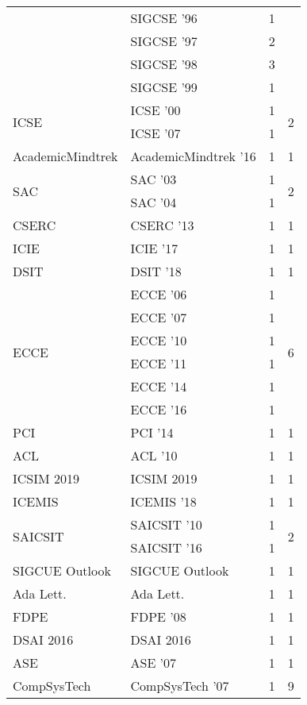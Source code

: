 \begin{table*}[t]
\begin{tabular}{llrr}
& SIGCSE '96 & 1 &\\
& SIGCSE '97 & 2 &\\
& SIGCSE '98 & 3 &\\
& SIGCSE '99 & 1 &\\
\multirow{2}{*}{ICSE } & ICSE '00 & 1 & \multirow{2}{*}{2}\\
& ICSE '07 & 1 &\\
\multirow{1}{*}{AcademicMindtrek } & AcademicMindtrek '16 & 1 & \multirow{1}{*}{1}\\
\multirow{2}{*}{SAC } & SAC '03 & 1 & \multirow{2}{*}{2}\\
& SAC '04 & 1 &\\
\multirow{1}{*}{CSERC } & CSERC '13 & 1 & \multirow{1}{*}{1}\\
\multirow{1}{*}{ICIE } & ICIE '17 & 1 & \multirow{1}{*}{1}\\
\multirow{1}{*}{DSIT } & DSIT '18 & 1 & \multirow{1}{*}{1}\\
\multirow{6}{*}{ECCE } & ECCE '06 & 1 & \multirow{6}{*}{6}\\
& ECCE '07 & 1 &\\
& ECCE '10 & 1 &\\
& ECCE '11 & 1 &\\
& ECCE '14 & 1 &\\
& ECCE '16 & 1 &\\
\multirow{1}{*}{PCI } & PCI '14 & 1 & \multirow{1}{*}{1}\\
\multirow{1}{*}{ACL } & ACL '10 & 1 & \multirow{1}{*}{1}\\
\multirow{1}{*}{ICSIM 2019} & ICSIM 2019 & 1 & \multirow{1}{*}{1}\\
\multirow{1}{*}{ICEMIS } & ICEMIS '18 & 1 & \multirow{1}{*}{1}\\
\multirow{2}{*}{SAICSIT } & SAICSIT '10 & 1 & \multirow{2}{*}{2}\\
& SAICSIT '16 & 1 &\\
\multirow{1}{*}{SIGCUE Outlook} & SIGCUE Outlook & 1 & \multirow{1}{*}{1}\\
\multirow{1}{*}{Ada Lett.} & Ada Lett. & 1 & \multirow{1}{*}{1}\\
\multirow{1}{*}{FDPE } & FDPE '08 & 1 & \multirow{1}{*}{1}\\
\multirow{1}{*}{DSAI 2016} & DSAI 2016 & 1 & \multirow{1}{*}{1}\\
\multirow{1}{*}{ASE } & ASE '07 & 1 & \multirow{1}{*}{1}\\
\multirow{5}{*}{CompSysTech } & CompSysTech '07 & 1 & \multirow{5}{*}{9}\\

\end{tabular}
\end{table*}

